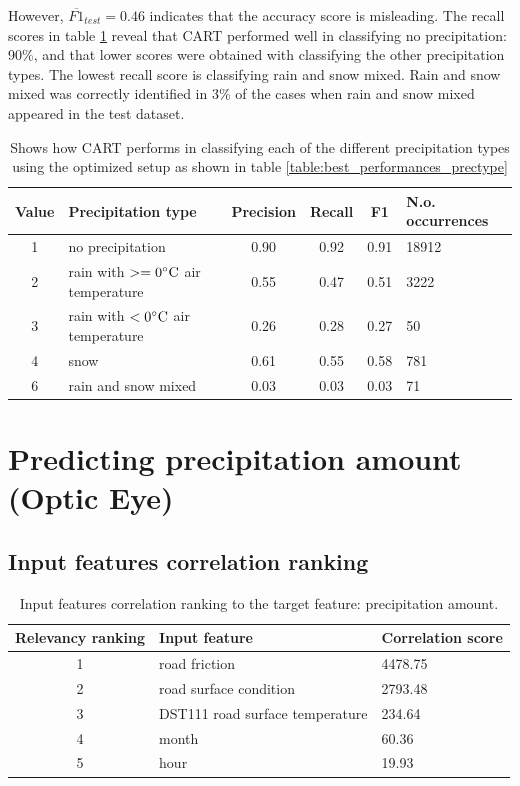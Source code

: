 	However, $\overline{F1}_{test} = 0.46$ indicates that the accuracy score is misleading. The recall scores in table \ref{table:classreport_prectype} reveal that CART performed well in classifying no precipitation: 90\%, and that lower scores were obtained with classifying the other precipitation types. The lowest recall score is classifying rain and snow mixed. Rain and snow mixed was correctly identified in 3\% of the cases when rain and snow mixed appeared in the test dataset. 

	\begin{table}[H]
		\centering
		\caption{Shows how CART performs in classifying each of the different precipitation types using the optimized setup as shown in table \ref{table:best_performances_prectype}}
		\begin{tabular}[6]{c |l | c | c | c | l }
    			Value & Precipitation type & Precision & Recall & F1 & N.o. occurrences \\
			\hline
			1 & no precipitation & 0.90 & 0.92 & 0.91 & 18912 \\ \hline
			2 & rain with $>= 0 \celsius$ air temperature & 0.55 & 0.47 & 0.51 & 3222 \\ \hline
			3 & rain with $< 0 \celsius$ air temperature & 0.26 & 0.28 & 0.27 & 50 \\ \hline
			4 & snow & 0.61 & 0.55 & 0.58 & 781 \\ \hline
			6 & rain and snow mixed & 0.03 & 0.03 & 0.03 & 71
			\label{table:classreport_prectype}
		\end{tabular}
	\end{table}



\section{Predicting precipitation amount (Optic Eye)} 
	\subsection{Input features correlation ranking}

	\begin{table}[H]
		\centering
		\caption{Input features correlation ranking to the target feature: precipitation amount. }
		\begin{tabular}[3]{c | l | l }
    			Relevancy ranking & Input feature & Correlation score  \\
			 \hline
			1 & road friction & 4478.75 \\ \hline
			2 & road surface condition & 2793.48 \\ \hline
			3 & DST111 road surface temperature & 234.64 \\ \hline
			4 & month & 60.36 \\ \hline
			5 & hour & 19.93 
			\label{table:feature_comparison_precamount}
		\end{tabular}
	\end{table}


